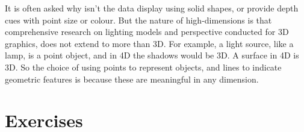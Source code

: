 \documentclass[
  letterpaper,
]{krantz}
\begin{document}
It is often asked why isn't the data display using solid shapes, or
provide depth cues with point size or colour. But the nature of
high-dimensions is that comprehensive research on lighting models and
perspective conducted for 3D graphics, does not extend to more than 3D.
For example, a light source, like a lamp, is a point object, and in 4D
the shadows would be 3D. A surface in 4D is 3D. So the choice of using
points to represent objects, and lines to indicate geometric features is
because these are meaningful in any dimension.

\section*{Exercises}\label{exercises-1}

\end{document}
